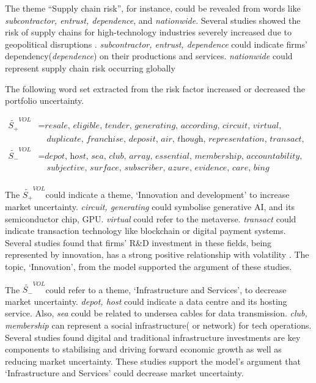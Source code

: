 \documentclass[logo,bsc,singlespacing,parskip]{infthesis}
\begin{document}
The theme “Supply chain risk”, for instance, could be revealed from words like \textit{subcontractor, entrust, dependence}, and \textit{nationwide}. Several studies showed the risk of supply chains for high-technology industries severely increased due to geopolitical disruptions \cite{economist2020, tingfang2021, lewis2019, wu2021}. \textit{subcontractor, entrust, dependence} could indicate firms’ dependency(\textit{dependence}) on their productions and services. \textit{nationwide} could represent supply chain risk occurring globally

The following word set extracted from the risk factor increased or decreased the portfolio uncertainty.

\begin{align*}
\tilde{S_{+}}^{VOL} &= \textit{resale, eligible, tender, generating, according, circuit, virtual, } \\
               &\quad \textit{duplicate, franchise, deposit, air, though, representation, transact, attorney} \\
\tilde{S_{-}}^{VOL} &= \textit{depot, host, sea, club, array, essential, membership, accountability,} \\
               &\quad \textit{subjective, surface, subscriber, azure, evidence, care, bing} \\
\end{align*}

The $\tilde{S_{+}}^{VOL}$could indicate a theme, ‘Innovation and development’ to increase market uncertainty. \textit{circuit, generating} could symbolise generative AI, and its semiconductor chip, GPU. \textit{virtual} could refer to the metaverse. \textit{transact} could indicate transaction technology like blockchain or digital payment systems. Several studies found that firms’ R&D investment in these fields, being represented by innovation, has a strong positive relationship with volatility \cite{Mazzucato2012, Gharbi2014, Hai2020}. The topic, ‘Innovation’, from the model supported the argument of these studies. 

The $\tilde{S_{-}}^{VOL}$could refer to a theme, ‘Infrastructure and Services’, to decrease market uncertainty. \textit{depot, host} could indicate a data centre and its hosting service. Also, \textit{sea} could be related to undersea cables for data transmission. \textit{club, membership} can represent a social infrastructure( or network) for tech operations. Several studies found digital and traditional infrastructure investments are key components to stabilising and driving forward economic growth as well as reducing market uncertainty\cite{Brinkman2022, BlancBrude2022, Gunnion2021}. These studies support the model’s argument that ‘Infrastructure and Services’ could decrease market uncertainty.
\end{document}

